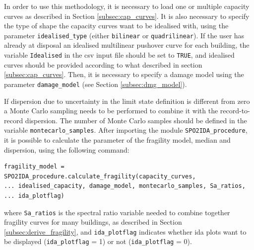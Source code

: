 In order to use this methodology, it is necessary to load one or multiple capacity curves as described in Section \ref{subsec:cap_curves}. It is also necessary to specify the type of shape the capacity curves want to be idealised with, using the parameter \verb=idealised_type= (either \verb=bilinear= or \verb=quadrilinear=). If the user has already at disposal an idealised multilinear pushover curve for each building, the variable \verb=Idealised= in the csv input file should be set to \verb=TRUE=, and idealised curves should be provided according to what described in section \ref{subsec:cap_curves}. Then, it is necessary to specify a damage model using the parameter \verb=damage_model= (see Section \ref{subsec:dmg_model}).

If dispersion due to uncertainty in the limit state definition is different from zero a Monte Carlo sampling needs to be performed to combine it with the record-to-record dispersion. The number of Monte Carlo samples should be defined in the variable \verb=montecarlo_samples=.
After importing the module \verb=SPO2IDA_procedure=, it is possible to calculate the parameter of the fragility model, median and dispersion, using the following command:

\begin{Verbatim}[frame=single, commandchars=\\\{\}, samepage=true]
fragility_model = SPO2IDA_procedure.calculate_fragility(capacity_curves,
... idealised_capacity, damage_model, montecarlo_samples, Sa_ratios,
... ida_plotflag)
\end{Verbatim}

where \verb=Sa_ratios= is the spectral ratio variable needed to combine together fragility curves for many buildings, as described in Section \ref{subsec:derive_fragility}, and \verb=ida_plotflag= indicates whether ida plots want to be displayed (\verb=ida_plotflag= = 1) or not (\verb=ida_plotflag= = 0).